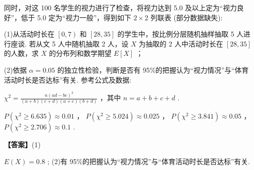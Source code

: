 \documentclass[10pt]{article}
\newcommand*\circled[1]{\tikz[baseline=(char.base)]{\node[shape=circle,draw,inner sep=1.5pt] (char) {\small #1};}}
\begin{document}
同时，对这 100 名学生的视力进行了检查，将视力达到 5.0 及以上定为``视力良好''，低于 5.0 定为``视力一般''，得到如下 \(2 \times  2\) 列联表 (部分数据缺失):

\begin{center}
\end{center}

(1)从活动时长在 \(\left\lbrack  {0,7}\right)\) 和 \(\left\lbrack  {{28},{35}}\right\rbrack\) 的学生中，按比例分层随机抽样抽取 5 人进行座谈. 若从文 5 人中随机抽取 2 人，设 \(X\) 为抽取的 2 人中活动时长在 \(\left\lbrack  {{28},{35}}\right\rbrack\) 的人数，求 \(X\) 的分布列和数学期望 \(E\left\lbrack  X\right\rbrack\) ；

(2)依据 \(\alpha  = {0.05}\) 的独立性检验，判断是否有 95\%的把握认为``视力情况''与``体育活动时长是否达标''有关. 参考公式及数据:

\circled{1} \({\chi }^{2} = \frac{n{\left( ad - bc\right) }^{2}}{\left( {a + b}\right) \left( {c + d}\right) \left( {a + c}\right) \left( {b + d}\right) }\) ，其中 \(n = a + b + c + d\) .

\circled{2} \(P\left( {{\chi }^{2} \geq  {6.635}}\right)  \approx  {0.01}\) ， \(P\left( {{\chi }^{2} \geq  {5.024}}\right)  \approx  {0.025}\) ， \(P\left( {{\chi }^{2} \geq  {3.841}}\right)  \approx  {0.05}\) ， \(P\left( {{\chi }^{2} \geq  {2.706}}\right)  \approx  {0.1}\) .

\textbf{【答案】}(1)

\begin{center}
\end{center}

\(E\left( X\right)  = {0.8}\) ; (2)有 95\%的把握认为``视力情况''与``体育活动时长是否达标''有关.
\end{document}
